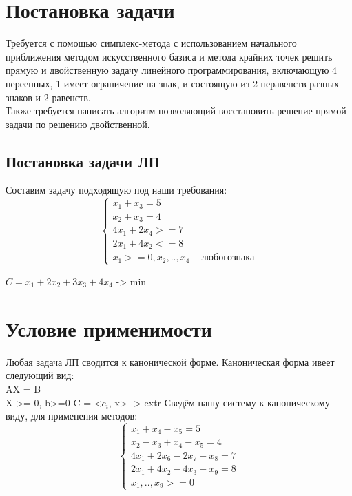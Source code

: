 \documentclass[a4]{article}
\begin{document}
	
	\section{Постановка задачи}
		Требуется с помощью симплекс-метода с использованием начального приближения методом искусственного базиса и метода крайних точек решить прямую и двойственную задачу линейного программирования, включающую 4 переенных, 1 имеет ограничение на знак, и состоящую из 2 неравенств разных знаков и 2 равенств.\\
		Также требуется написать алгоритм позволяющий восстановить решение прямой задачи по решению двойственной.\\
		\subsection{Постановка задачи ЛП}
		Составим задачу подходящую под наши требования:\\
		\begin{equation*}
			\begin{cases}
				x_1 + x_3 = 5\\
				x_2 + x_3 = 4\\
				4x_1 + 2x_4 >= 7\\
				2x_1 + 4x_2 <= 8\\
				x_1>=0, x_2,.., x_4 - любого знака
			\end{cases}
		\end{equation*}
		
		\begin{center}
			$C = x_1 + 2x_2 + 3x_3 + 4x_4$ -> min
		\end{center}
		
	\section{Условие применимости}
		Любая задача ЛП сводится к канонической форме. Каноническая форма ивеет следующий вид:\\
		AX = B\\
		X >= 0, b>=0
		C = <$c_i$, x> -> extr
		Сведём нашу систему к каноническому виду, для применения методов:\\
		
		\begin{equation*}
			\begin{cases}
				x_1 + x_4 - x_5 = 5\\
				x_2 - x_3 + x_4 - x_5 = 4\\
				4x_1 + 2x_6 - 2x_7 - x_8 = 7\\
				2x_1 + 4x_2 - 4x_3 + x_9 = 8\\
				x_1, .., x_9 >=0
			\end{cases}
		\end{equation*}
		
\end{document}

